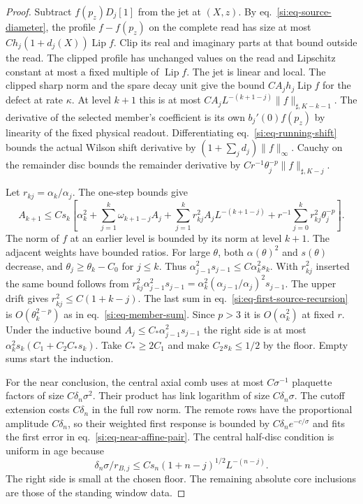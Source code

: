 \documentclass[11pt,letterpaper,reqno]{amsart}
\numberwithin{equation}{section}
\renewcommand{\eqref}[1]{\textup{eq.~\ref{#1}}}
\theoremstyle{definition}
\theoremstyle{remark}
\begin{document}
\begin{proof}
Subtract $f(p_z)D_j[1]$ from the jet at $(X,z)$. By
\eqref{si:eq-source-diameter}, the profile $f-f(p_z)$ on the
complete read has size at most
$C h_j(1+d_j(X))\operatorname{Lip}f$. Clip its real and imaginary
parts at that bound outside the read. The clipped profile has
unchanged values on the read and Lipschitz constant at most a
fixed multiple of $\operatorname{Lip}f$. The jet is linear and
local. The clipped sharp norm and the spare decay unit give the
bound $C A_jh_j\operatorname{Lip}f$ for the defect at rate
$\kappa$. At level $k+1$ this is at most
$C A_j L^{-(k+1-j)}\|f\|_{\sharp,K-k-1}$. The derivative of the
selected member's coefficient is its own $b_j'(0)f(p_z)$ by
linearity of the fixed physical readout. Differentiating
\eqref{si:eq-running-shift} bounds the actual Wilson shift
derivative by $(1+\sum_jd_j)\|f\|_\infty$. Cauchy on the
remainder disc bounds the remainder derivative by
$C r^{-1}\theta_j^{-p}\|f\|_{\sharp,K-j}$.

Let $r_{kj}=\alpha_k/\alpha_j$. The one-step bounds give
\begin{equation}\label{si:eq-first-source-recursion}
 A_{k+1}\le C s_k\left[\alpha_k^2+\sum_{j=1}^k\omega_{k+1-j}A_j
   +\sum_{j=1}^k r_{kj}^2 A_j L^{-(k+1-j)}
   +r^{-1}\sum_{j=0}^k r_{kj}^2\theta_j^{-p}\right].
\end{equation}
The norm of $f$ at an earlier level is bounded by its norm at
level $k+1$. The adjacent weights have bounded ratios. For large
$\theta$, both $\alpha(\theta)^2$ and $s(\theta)$ decrease, and
$\theta_j\ge\theta_k-C_0$ for $j\le k$. Thus
$\alpha_{j-1}^2s_{j-1}\le C\alpha_k^2s_k$. With $r_{kj}^2$
inserted the same bound follows from
$r_{kj}^2\alpha_{j-1}^2s_{j-1}
 =\alpha_k^2(\alpha_{j-1}/\alpha_j)^2s_{j-1}$.
The upper drift gives $r_{kj}^2\le C(1+k-j)$. The last sum in
\eqref{si:eq-first-source-recursion} is $O(\theta_k^{2-p})$ as in
\eqref{si:eq-member-sum}. Since $p>3$ it is $O(\alpha_k^2)$ at
fixed $r$. Under the inductive bound
$A_j\le C_*\alpha_{j-1}^2s_{j-1}$ the right side is at most
$\alpha_k^2s_k(C_1+C_2 C_*s_k)$. Take $C_*\ge2C_1$ and make
$C_2s_k\le1/2$ by the floor. Empty sums start the induction.

For the near conclusion, the central axial comb uses at most
$C\sigma^{-1}$ plaquette factors of size $C\delta_n\sigma^2$.
Their product has link logarithm of size $C\delta_n\sigma$.
The cutoff extension costs $C\delta_n$ in the full row norm.
The remote rows have the proportional amplitude $C\delta_n$,
so their weighted first response is bounded by
$C\delta_n e^{-c/\sigma}$ and fits the first error in
\eqref{si:eq-near-affine-pair}. The central half-disc condition
is uniform in age because
\[
 \delta_n\sigma/r_{B,j}
  \le C s_n(1+n-j)^{1/2}L^{-(n-j)}.
\]
The right side is small at the chosen floor. The remaining
absolute core inclusions are those of the standing window data.


\end{proof}
\end{document}
